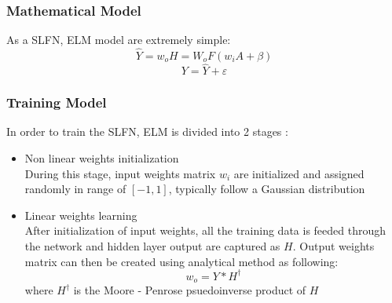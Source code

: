 \documentclass[13pt]{article}
\begin{document}
\subsubsection{Mathematical Model}
As a SLFN, ELM model are extremely simple:
\begin{equation}
    \hat{Y} = w_o H=W_o F(w_i A + \beta)
\end{equation}
\begin{equation}
    Y = \hat{Y} + \varepsilon
\end{equation}
\subsubsection{Training Model}
In order to train the SLFN, ELM is divided into 2 stages \cite{huang_extreme_2016}:
\begin{itemize}
    \item Non linear weights initialization\\
    During this stage, input weights matrix $w_i$ are initialized and assigned randomly in range of $[-1,1]$, typically follow a Gaussian distribution 
    \item Linear weights learning\\
    After initialization of input weights, all the training data is feeded through the network and hidden layer output are captured as $H$. Output weights matrix can then be created using analytical method as following:
    \begin{equation}
        w_o = Y * H^\dagger
    \end{equation}
    where $H^\dagger$ is the Moore - Penrose psuedoinverse product of $H$
\end{itemize}
\end{document}
